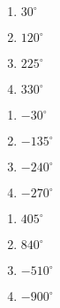 \begin{multicols}{4} 

\begin{enumerate}

\setcounter{enumi}{\value{HW}}

\item  $30^{\circ}$  \label{orientedanglefirst}

\item  $120^{\circ}$

\item  $225^{\circ}$

\item $330^{\circ}$ 


\setcounter{HW}{\value{enumi}}

\end{enumerate}

\end{multicols}

\begin{multicols}{4} 

\begin{enumerate}

\setcounter{enumi}{\value{HW}}

\item  $-30^{\circ}$

\item $-135^{\circ}$ 

\item $-240^{\circ}$

\item $-270^{\circ}$

\setcounter{HW}{\value{enumi}}

\end{enumerate}

\end{multicols}


\begin{multicols}{4} 

\begin{enumerate}

\setcounter{enumi}{\value{HW}}

\item $405^{\circ}$  

\item $840^{\circ}$ 

\item $-510^{\circ}$

\item $-900^{\circ}$

\label{orientedanglelast}

\setcounter{HW}{\value{enumi}}

\end{enumerate}

\end{multicols}


